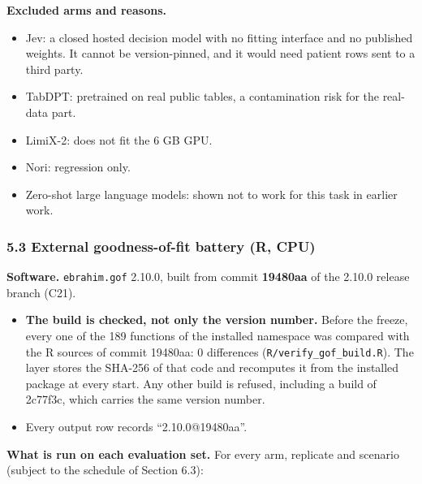 \documentclass[
  10pt,
]{article}
\providecommand{\tightlist}{%
  \setlength{\itemsep}{0pt}\setlength{\parskip}{0pt}}
\begin{document}
\textbf{Excluded arms and reasons.}

\begin{itemize}
\tightlist
\item
  Jev: a closed hosted decision model with no fitting
  interface and no published weights. It cannot be
  version-pinned, and it would need patient rows sent to a
  third party.
\item
  TabDPT: pretrained on real public tables, a contamination
  risk for the real-data part.
\item
  LimiX-2: does not fit the 6 GB GPU.
\item
  Nori: regression only.
\item
  Zero-shot large language models: shown not to work for
  this task in earlier work.
\end{itemize}

\subsubsection{5.3 External goodness-of-fit battery (R,
CPU)}\label{external-goodness-of-fit-battery-r-cpu}

\textbf{Software.} \texttt{ebrahim.gof} 2.10.0, built from
commit \textbf{19480aa} of the 2.10.0 release branch (C21).

\begin{itemize}
\tightlist
\item
  \textbf{The build is checked, not only the version
  number.} Before the freeze, every one of the 189 functions
  of the installed namespace was compared with the R sources
  of commit 19480aa: 0 differences
  (\texttt{R/verify\_gof\_build.R}). The layer stores the
  SHA-256 of that code and recomputes it from the installed
  package at every start. Any other build is refused,
  including a build of 2c77f3c, which carries the same
  version number.
\item
  Every output row records ``2.10.0@19480aa''.
\end{itemize}

\textbf{What is run on each evaluation set.} For every arm,
replicate and scenario (subject to the schedule of Section
6.3):
\end{document}
